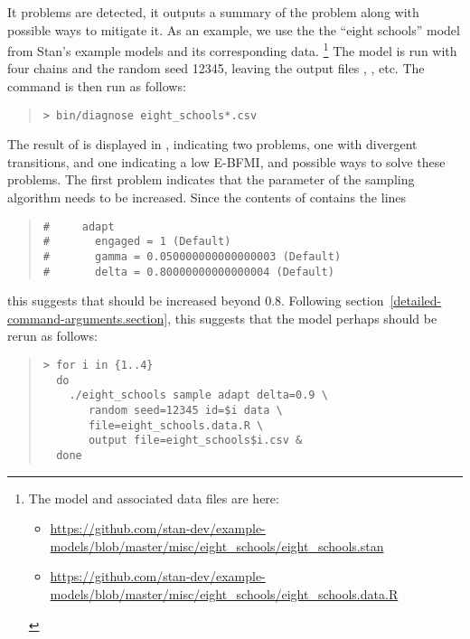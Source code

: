 It problems are detected, it outputs a summary of the problem along with
possible ways to mitigate it. As an example,  we use the
the ``eight schools'' model from Stan's example models and
its corresponding data.%
%
\footnote{The model and associated data files are here:
  \begin{itemize}
  \item
    \url{https://github.com/stan-dev/example-models/blob/master/misc/eight_schools/eight_schools.stan}
  \item
    \url{https://github.com/stan-dev/example-models/blob/master/misc/eight_schools/eight_schools.data.R}
  \end{itemize}
}
The model is run with four chains and the random seed 12345, leaving
the output files , ,
etc. The  command is then run as follows:
\begin{quote}
\begin{Verbatim}[fontshape=sl]
> bin/diagnose eight_schools*.csv
\end{Verbatim}
\end{quote}
The result of  is displayed in
, indicating two problems, one with
divergent transitions, and one indicating a low E-BFMI, and possible
ways to solve these problems. The first problem indicates that the
parameter  of the sampling algorithm needs to be
increased. Since the contents of  contains
the lines
\begin{quote}
\begin{Verbatim}
#     adapt
#       engaged = 1 (Default)
#       gamma = 0.050000000000000003 (Default)
#       delta = 0.80000000000000004 (Default)
\end{Verbatim}
\end{quote}
this suggests that  should be increased beyond
0.8. Following section~\ref{detailed-command-arguments.section}, this
suggests that the model perhaps should be rerun as follows:
\begin{quote}
\begin{Verbatim}[fontshape=sl]
> for i in {1..4}
  do
    ./eight_schools sample adapt delta=0.9 \
       random seed=12345 id=$i data \
       file=eight_schools.data.R \
       output file=eight_schools$i.csv &
  done
\end{Verbatim}
\end{quote}


